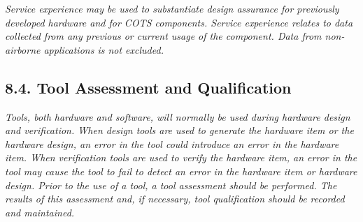\documentclass[
]{article}
\begin{document}
\emph{Service experience may be used to substantiate design assurance
for previously developed hardware and for COTS components. Service
experience relates to data collected from any previous or current usage
of the component. Data from non-airborne applications is not excluded.}

\hypertarget{tool-assessment-and-qualification}{%
\subsection{8.4. Tool Assessment and
Qualification}\label{tool-assessment-and-qualification}}

\emph{Tools, both hardware and software, will normally be used during
hardware design and verification. When design tools are used to generate
the hardware item or the hardware design, an error in the tool could
introduce an error in the hardware item. When verification tools are
used to verify the hardware item, an error in the tool may cause the
tool to fail to detect an error in the hardware item or hardware design.
Prior to the use of a tool, a tool assessment should be performed. The
results of this assessment and, if necessary, tool qualification should
be recorded and maintained.}
\end{document}
